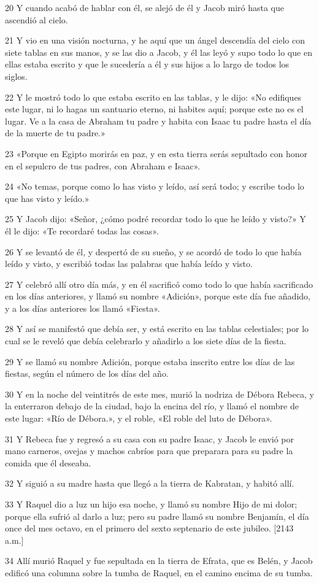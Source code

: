 \par 20 Y cuando acabó de hablar con él, se alejó de él y Jacob miró hasta que ascendió al cielo.
\par 21 Y vio en una visión nocturna, y he aquí que un ángel descendía del cielo con siete tablas en sus manos, y se las dio a Jacob, y él las leyó y supo todo lo que en ellas estaba escrito y que le sucedería a él y sus hijos a lo largo de todos los siglos.
\par 22 Y le mostró todo lo que estaba escrito en las tablas, y le dijo: «No edifiques este lugar, ni lo hagas un santuario eterno, ni habites aquí; porque este no es el lugar. Ve a la casa de Abraham tu padre y habita con Isaac tu padre hasta el día de la muerte de tu padre.»
\par 23 «Porque en Egipto morirás en paz, y en esta tierra serás sepultado con honor en el sepulcro de tus padres, con Abraham e Isaac».
\par 24 «No temas, porque como lo has visto y leído, así será todo; y escribe todo lo que has visto y leído.»
\par 25 Y Jacob dijo: «Señor, ¿cómo podré recordar todo lo que he leído y visto?» Y él le dijo: «Te recordaré todas las cosas».
\par 26 Y se levantó de él, y despertó de su sueño, y se acordó de todo lo que había leído y visto, y escribió todas las palabras que había leído y visto.
\par 27 Y celebró allí otro día más, y en él sacrificó como todo lo que había sacrificado en los días anteriores, y llamó su nombre «Adición», porque este día fue añadido, y a los días anteriores los llamó «Fiesta».
\par 28 Y así se manifestó que debía ser, y está escrito en las tablas celestiales; por lo cual se le reveló que debía celebrarlo y añadirlo a los siete días de la fiesta.
\par 29 Y se llamó su nombre Adición, porque estaba inscrito entre los días de las fiestas, según el número de los días del año.
\par 30 Y en la noche del veintitrés de este mes, murió la nodriza de Débora Rebeca, y la enterraron debajo de la ciudad, bajo la encina del río, y llamó el nombre de este lugar: «Río de Débora.», y el roble, «El roble del luto de Débora».
\par 31 Y Rebeca fue y regresó a su casa con su padre Isaac, y Jacob le envió por mano carneros, ovejas y machos cabríos para que preparara para su padre la comida que él deseaba.
\par 32 Y siguió a su madre hasta que llegó a la tierra de Kabratan, y habitó allí.
\par 33 Y Raquel dio a luz un hijo esa noche, y llamó su nombre Hijo de mi dolor; porque ella sufrió al darlo a luz; pero su padre llamó su nombre Benjamín, el día once del mes octavo, en el primero del sexto septenario de este jubileo. [2143 a.m.]
\par 34 Allí murió Raquel y fue sepultada en la tierra de Efrata, que es Belén, y Jacob edificó una columna sobre la tumba de Raquel, en el camino encima de su tumba.


